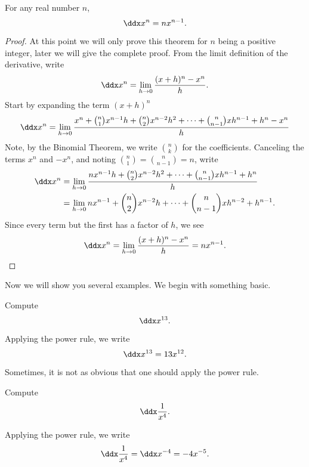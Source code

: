 \begin{mainTheorem}
For any real number $n$, 
\[
\ddx x^n = n x^{n-1}.
\]
\end{mainTheorem}
\begin{proof}
At this point we will only prove this theorem for $n$ being a positive
integer, later we will give the complete proof. From the limit
definition of the derivative, write
\[
\ddx x^n = \lim_{ h\to0} \frac{(x+ h)^n-x^n}{h}.
\]
Start by expanding the term $(x+h)^n$
\[
\ddx x^n=\lim_{h\to0} \frac{x^n + \binom{n}{1}x^{n-1} h + \binom{n}{2}x^{n-2} h^2+\cdots+\binom{n}{n-1}x h^{n-1} +  h^n-x^n}{h}
\]
Note, by the Binomial Theorem, we write $\binom{n}{k}$ for the
coefficients. Canceling the terms $x^n$ and $-x^n$, and noting
$\binom{n}{1}= \binom{n}{n-1}= n$, write
\begin{align*}
\ddx x^n&=\lim_{h\to0} \frac{nx^{n-1} h + \binom{n}{2}x^{n-2} h^2+\cdots+\binom{n}{n-1}x h^{n-1} +  h^n}{h} \\
&=\lim_{h\to0} nx^{n-1} + \binom{n}{2}x^{n-2} h+\cdots+\binom{n}{n-1}x h^{n-2} +  h^{n-1}.
\end{align*}
Since every term but the first has a factor of $h$, we see
\[
\ddx x^n = \lim_{ h\to0}\frac{(x+ h)^n-x^n}{h} = nx^{n-1}.
\]
\end{proof}

Now we will show you several examples. We begin with something basic.

\begin{example}
Compute
\[
\ddx x^{13}.
\]
\end{example}
\begin{solution}
Applying the power rule, we write
\[
\ddx x^{13} = 13x^{12}.
\]
\end{solution}

Sometimes, it is not as obvious that one should apply the power rule.

\begin{example}
Compute
\[
\ddx \frac{1}{x^4}.
\]
\end{example}
\begin{solution}
Applying the power rule, we write
\[
\ddx \frac{1}{x^4} = \ddx x^{-4} = -4x^{-5}.
\]
\end{solution}

